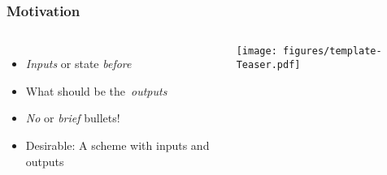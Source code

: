 




\begin{frame}
    \frametitle{Motivation}
    \begin{columns}
      \begin{itemize}
          \item \emph{Inputs} or state \emph{before}
          \item What should be the~\emph{outputs}
          \item \emph{No} or \emph{brief} bullets!
          \item Desirable: A scheme with inputs and outputs
      \end{itemize}
       
      \texttt{[image: figures/template-Teaser.pdf]}
    \end{columns}
  \end{frame}
  
